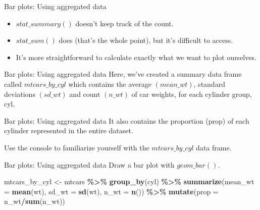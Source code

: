 \documentclass[
  ignorenonframetext,
]{beamer}
\newenvironment{Shaded}{\begin{snugshade}}{\end{snugshade}}
\newcommand{\AttributeTok}[1]{\textcolor[rgb]{0.13,0.29,0.53}{#1}}
\newcommand{\FunctionTok}[1]{\textcolor[rgb]{0.13,0.29,0.53}{\textbf{#1}}}
\newcommand{\NormalTok}[1]{#1}
\newcommand{\OtherTok}[1]{\textcolor[rgb]{0.56,0.35,0.01}{#1}}
\newcommand{\SpecialCharTok}[1]{\textcolor[rgb]{0.81,0.36,0.00}{\textbf{#1}}}
\begin{document}
\begin{frame}{Bar plots: Using aggregated data}
\label{bar-plots-using-aggregated-data-1}
\begin{itemize}
\item
  \(stat\_summary()\) doesn't keep track of the count.
\item
  \(stat\_sum()\) does (that's the whole point), but it's difficult to
  access.
\item
  It's more straightforward to calculate exactly what we want to plot
  ourselves.
\end{itemize}
\end{frame}

\begin{frame}{Bar plots: Using aggregated data}
\label{bar-plots-using-aggregated-data-2}
Here, we've created a summary data frame called \(mtcars\_by\_cyl\)
which contains the average \((mean\_wt)\), standard deviations
\((sd\_wt)\) and count \((n\_wt)\) of car weights, for each cylinder
group, cyl.
\end{frame}

\begin{frame}{Bar plots: Using aggregated data}
\label{bar-plots-using-aggregated-data-3}
It also contains the proportion (prop) of each cylinder represented in
the entire dataset.

Use the console to familiarize yourself with the \(mtcars\_by\_cyl\)
data frame.
\end{frame}

\begin{frame}[fragile]{Bar plots: Using aggregated data}
\label{bar-plots-using-aggregated-data-4}
Draw a bar plot with \(geom\_bar()\).


\begin{Shaded}
\begin{Highlighting}[]
\NormalTok{mtcars\_by\_cyl }\OtherTok{\textless{}{-}}\NormalTok{ mtcars }\SpecialCharTok{\%\textgreater{}\%}
    \FunctionTok{group\_by}\NormalTok{(cyl) }\SpecialCharTok{\%\textgreater{}\%}
    \FunctionTok{summarize}\NormalTok{(}\AttributeTok{mean\_wt =} \FunctionTok{mean}\NormalTok{(wt), }\AttributeTok{sd\_wt =} \FunctionTok{sd}\NormalTok{(wt), }\AttributeTok{n\_wt =} \FunctionTok{n}\NormalTok{()) }\SpecialCharTok{\%\textgreater{}\%}
    \FunctionTok{mutate}\NormalTok{(}\AttributeTok{prop =}\NormalTok{ n\_wt}\SpecialCharTok{/}\FunctionTok{sum}\NormalTok{(n\_wt))}
\end{Highlighting}
\end{Shaded}
\end{frame}
\end{document}
